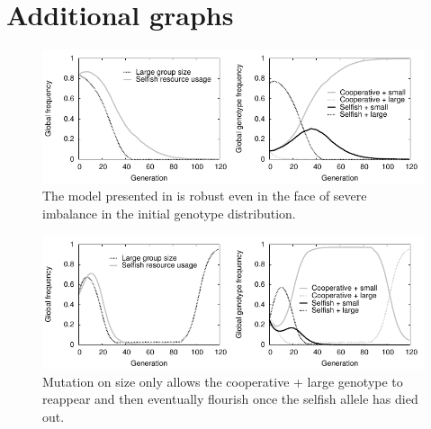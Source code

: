 \documentclass[11pt]{article}
\begin{document}

{}


\newpage
\appendix
\section{Additional graphs}
\begin{figure}[!ht]
  \centering
  \includegraphics{unevenplot.pdf}
  \caption{The model presented in \citet{orig} is robust even in the face of severe imbalance in the initial genotype distribution.}
  \label{fig:unevenplot}
\end{figure}

\begin{figure}[!ht]
  \centering
  \includegraphics{sizeplot.pdf}
  \caption{Mutation on size only allows the cooperative + large genotype to reappear and then eventually flourish once the selfish allele has died out.}
  \label{fig:sizeplot}
\end{figure}



\end{document}
